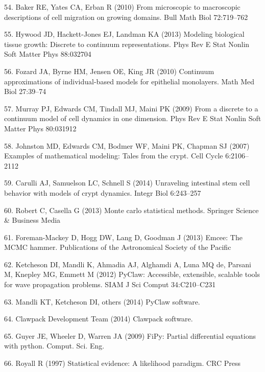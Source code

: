 \documentclass[10pt,letterpaper]{article}
\begin{document}
\hypertarget{ref-Baker2010-ne}{}
54. Baker RE, Yates CA, Erban R (2010) From microscopic to macroscopic
descriptions of cell migration on growing domains. Bull Math Biol
72:719--762

\hypertarget{ref-Hywood2013-zf}{}
55. Hywood JD, Hackett-Jones EJ, Landman KA (2013) Modeling biological
tissue growth: Discrete to continuum representations. Phys Rev E Stat
Nonlin Soft Matter Phys 88:032704

\hypertarget{ref-Fozard2010-hd}{}
56. Fozard JA, Byrne HM, Jensen OE, King JR (2010) Continuum
approximations of individual-based models for epithelial monolayers.
Math Med Biol 27:39--74

\hypertarget{ref-Murray2009-zg}{}
57. Murray PJ, Edwards CM, Tindall MJ, Maini PK (2009) From a discrete
to a continuum model of cell dynamics in one dimension. Phys Rev E Stat
Nonlin Soft Matter Phys 80:031912

\hypertarget{ref-Johnston2007-pq}{}
58. Johnston MD, Edwards CM, Bodmer WF, Maini PK, Chapman SJ (2007)
Examples of mathematical modeling: Tales from the crypt. Cell Cycle
6:2106--2112

\hypertarget{ref-Carulli2014-bd}{}
59. Carulli AJ, Samuelson LC, Schnell S (2014) Unraveling intestinal
stem cell behavior with models of crypt dynamics. Integr Biol 6:243--257

\hypertarget{ref-Robert2013-gx}{}
60. Robert C, Casella G (2013) Monte carlo statistical methods. Springer
Science \& Business Media

\hypertarget{ref-Foreman-Mackey2013-mb}{}
61. Foreman-Mackey D, Hogg DW, Lang D, Goodman J (2013) Emcee: The MCMC
hammer. Publications of the Astronomical Society of the Pacific

\hypertarget{ref-Ketcheson2012-od}{}
62. Ketcheson DI, Mandli K, Ahmadia AJ, Alghamdi A, Luna MQ de, Parsani
M, Knepley MG, Emmett M (2012) PyClaw: Accessible, extensible, scalable
tools for wave propagation problems. SIAM J Sci Comput 34:C210--C231

\hypertarget{ref-Pyclaw2014-py}{}
63. Mandli KT, Ketcheson DI, others (2014) PyClaw software.

\hypertarget{ref-Clawpack2014-cs}{}
64. Clawpack Development Team (2014) Clawpack software.

\hypertarget{ref-Guyer2009-sq}{}
65. Guyer JE, Wheeler D, Warren JA (2009) FiPy: Partial differential
equations with python. Comput. Sci. Eng.

\hypertarget{ref-Royall1997-ai}{}
66. Royall R (1997) Statistical evidence: A likelihood paradigm. CRC
Press
\end{document}
